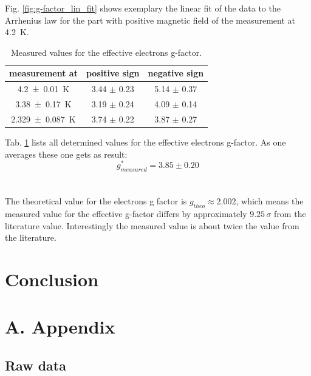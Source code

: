 \documentclass[12pt,a4paper]{article}
\begin{document}
Fig. \ref{fig:g-factor_lin_fit} shows exemplary the linear fit of the data to the Arrhenius law for the part with positive magnetic field of the measurement at \SI{4.2}{K}.

\begin{table} [H]
\centering
\begin{tabular}{|c|c|c|}
\hline 
measurement at & positive sign & negative sign \\ 
\hline 
\SI{4.2 \pm 0.01}{K} & 3.44 $\pm$ 0.23 & 5.14 $\pm$ 0.37 \\ 
\hline 
\SI{3.38 \pm 0.17}{K} & 3.19 $\pm$ 0.24 & 4.09 $\pm$ 0.14 \\ 
\hline 
\SI{2.329 \pm 0.087}{K} & 3.74 $\pm$ 0.22 & 3.87 $\pm$ 0.27 \\ 
\hline 
\end{tabular} 
\caption{Measured values for the effective electrons g-factor.}
\label{tab:electron_g_factor}
\end{table}

Tab. \ref{tab:electron_g_factor} lists all determined values for the effective electrons g-factor. As one averages these one gets as result:
\begin{equation*}
g^*_{measured} = 3.85 \pm 0.20
\end{equation*}\\
\\
The theoretical value for the electrons g factor is $g_{theo} \approx 2.002$, which means the measured value for the effective g-factor differs by approximately $9.25 \, \sigma$ from the literature value. Interestingly the measured value is about twice the value from the literature. 



\section{Conclusion}



\newpage
\section*{A. Appendix}
\subsection*{Raw data}
\end{document}
